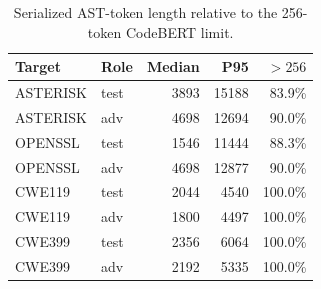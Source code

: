 \begin{table}[t]
\centering
\caption{Serialized AST-token length relative to the 256-token CodeBERT limit.}
\label{tab:length-truncation}
\scriptsize
\begin{tabular}{llrrr}
\toprule
Target & Role & Median & P95 & $>256$ \\
\midrule
ASTERISK & test & 3893 & 15188 & 83.9\% \\
ASTERISK & adv & 4698 & 12694 & 90.0\% \\
OPENSSL & test & 1546 & 11444 & 88.3\% \\
OPENSSL & adv & 4698 & 12877 & 90.0\% \\
CWE119 & test & 2044 & 4540 & 100.0\% \\
CWE119 & adv & 1800 & 4497 & 100.0\% \\
CWE399 & test & 2356 & 6064 & 100.0\% \\
CWE399 & adv & 2192 & 5335 & 100.0\% \\
\bottomrule
\end{tabular}
\end{table}
